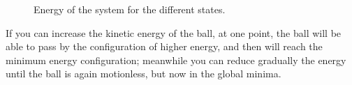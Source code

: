 \begin{figure}[h!]
\centering
{}
\caption{Energy of the system for the different states.}
\label{figur10}
\end{figure}

If you can increase the kinetic energy of the ball, at one point, the ball will be able to pass by the configuration of higher energy, and then will reach the minimum energy configuration; meanwhile you can reduce gradually the energy until the ball is again motionless, but now in the global minima.

